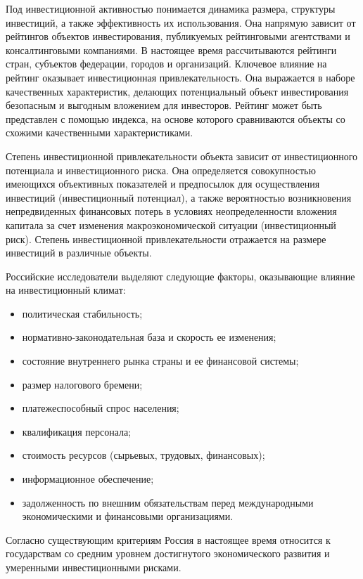 Под инвестиционной активностью понимается динамика размера, структуры инвестиций, а также эффективность их использования.
Она напрямую зависит от рейтингов объектов инвестирования, публикуемых рейтинговыми агентствами и консалтинговыми компаниями.
В настоящее время рассчитываются рейтинги стран, субъектов федерации, городов и организаций.
Ключевое влияние на рейтинг оказывает инвестиционная привлекательность.
Она выражается в наборе качественных характеристик, делающих потенциальный объект  инвестирования безопасным и выгодным вложением для инвесторов.
Рейтинг может быть представлен с помощью индекса, на основе которого сравниваются объекты со схожими качественными характеристиками.

Степень инвестиционной привлекательности объекта зависит от инвестиционного потенциала и инвестиционного риска.
Она определяется совокупностью имеющихся объективных показателей и предпосылок для осуществления инвестиций (инвестиционный потенциал), а также вероятностью возникновения непредвиденных финансовых потерь в условиях неопределенности вложения капитала за счет изменения макроэкономической ситуации (инвестиционный риск).
Степень инвестиционной привлекательности отражается на размере инвестиций в различные объекты.

Российские исследователи выделяют следующие факторы, оказывающие влияние на инвестиционный климат:
\begin{itemize}
	\setlength\itemsep{0pt}
	\item политическая стабильность;
	\item нормативно-законодательная база и скорость ее изменения;
	\item состояние внутреннего рынка страны и ее финансовой системы;
	\item размер налогового бремени;
	\item платежеспособный спрос населения;
	\item квалификация персонала;
	\item стоимость ресурсов (сырьевых, трудовых, финансовых);
	\item информационное обеспечение;
	\item задолженность по внешним обязательствам перед международными экономическими и финансовыми организациями.
\end{itemize}

Согласно существующим критериям Россия в настоящее время относится к государствам со средним уровнем достигнутого экономического развития  и умеренными инвестиционными рисками.

